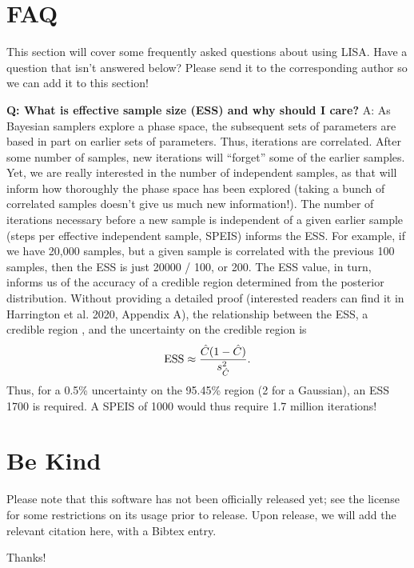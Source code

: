\documentclass[letterpaper, 12pt]{article}
\begin{document}
\section{FAQ}

This section will cover some frequently asked questions about using LISA.  
Have a question that isn't answered below?  Please send it to the corresponding 
author so we can add it to this section! \newline

\noindent \textbf{Q: What is effective sample size (ESS) and why should I care?}
A: As Bayesian samplers explore a phase space, the subsequent sets of parameters
are based in part on earlier sets of parameters.  Thus, iterations are 
correlated.  After some number of samples, new iterations will ``forget'' some 
of the earlier samples.  Yet, we are really interested in the number of 
independent samples, as that will inform how thoroughly the phase space has 
been explored (taking a bunch of correlated samples doesn't give us much new 
information!).  The number of iterations necessary before a new sample is 
independent of a given earlier sample (steps per effective independent sample, 
SPEIS) informs the ESS.  For example, if we have 20,000 samples, but a given 
sample is correlated with the previous 100 samples, then the ESS is just 
20000 / 100, or 200.  The ESS value, in turn, informs us of the accuracy of 
a credible region determined from the posterior distribution.  Without 
providing a detailed proof (interested readers can find it in Harrington et 
al. 2020, Appendix A), the relationship between the ESS, a credible region 
, and the uncertainty on the credible region 
 is
\begin{equation}
{\rm ESS} \approx \frac{\hat{C}(1-\hat{C})}{s\sbp{\hat{C}}{2}}.
\end{equation}
Thus, for a 0.5\% uncertainty on the 95.45\% region (2\math{\sigma} for a 
Gaussian), an ESS \math{\approx} 1700 is required.  A SPEIS of 1000 would 
thus require 1.7 million iterations!


\section{Be Kind}
\label{sec:bekind}
Please note that this software has not been officially released yet; see the 
license for some restrictions on its usage prior to release.  Upon release, 
we will add the relevant citation here, with a Bibtex entry.

\noindent Thanks!


\end{document}
